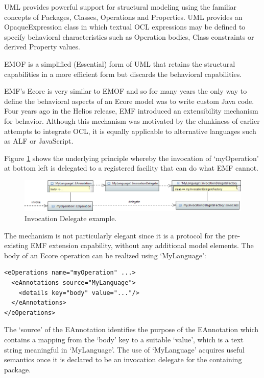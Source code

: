 \documentclass[a4paper]{article}
\begin{document}
UML provides powerful support for structural modeling using the  familiar concepts of Packages, Classes, Operations and Properties. UML provides an OpaqueExpression class in which textual OCL expressions may be defined to specify behavioral characteristics such as Operation bodies, Class constraints or derived Property values.

EMOF is a simplified (Essential) form of UML that retains the structural capabilities in a more efficient form but discards the behavioral capabilities.

EMF's Ecore is very similar to EMOF and so for many years the only way to define the behavioral aspects of an Ecore model was to write custom Java code. Four years ago in the Helios release, EMF introduced an extensibility mechanism for behavior. Although this mechanism was motivated by the clunkiness of earlier attempts to integrate OCL, it is equally applicable to alternative languages such as ALF or JavaScript. 

Figure \ref{fig:InvocationDelegate} shows the underlying principle whereby the invocation of `myOperation' at bottom left is delegated to a registered facility that can do what EMF cannot. 

\begin{figure}
  \begin{center}
    \includegraphics[width=6.75in]{InvocationDelegate.png}
  \end{center}
  \caption{Invocation Delegate example.}
  \label{fig:InvocationDelegate}
\end{figure}


The mechanism is not particularly elegant since it is a protocol for the pre-existing EMF extension capability, without any additional model elements. The body of an Ecore operation can be realized using `MyLanguage':

\begin{verbatim}
<eOperations name="myOperation" ...>
  <eAnnotations source="MyLanguage">
    <details key="body" value="..."/>
  </eAnnotations>
</eOperations>
\end{verbatim}

The `source' of the EAnnotation identifies the purpose of the EAnnotation which contains a mapping from the `body' key to a suitable `value', which is a text string meaningful in `MyLanguage'. The use of `MyLanguage' acquires useful semantics once it is declared to be an invocation delegate for the containing package.
\end{document}
